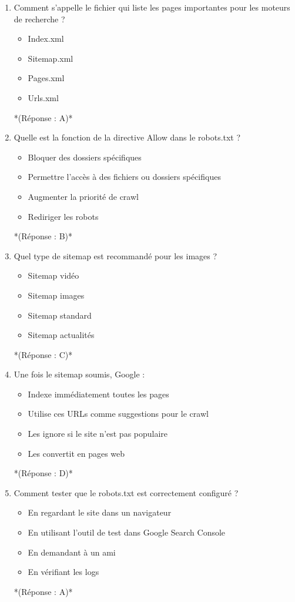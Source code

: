 \documentclass[12pt,a4paper,twoside]{report}
\begin{document}
\begin{enumerate}
\item Comment s'appelle le fichier qui liste les pages importantes pour les moteurs de recherche ?
\begin{itemize}
\item[A)] Index.xml
\item[B)] Sitemap.xml
\item[C)] Pages.xml
\item[D)] Urls.xml
\end{itemize}
*(Réponse : A)*

\item Quelle est la fonction de la directive Allow dans le robots.txt ?
\begin{itemize}
\item[A)] Bloquer des dossiers spécifiques
\item[B)] Permettre l'accès à des fichiers ou dossiers spécifiques
\item[C)] Augmenter la priorité de crawl
\item[D)] Rediriger les robots
\end{itemize}
*(Réponse : B)*

\item Quel type de sitemap est recommandé pour les images ?
\begin{itemize}
\item[A)] Sitemap vidéo
\item[B)] Sitemap images
\item[C)] Sitemap standard
\item[D)] Sitemap actualités
\end{itemize}
*(Réponse : C)*

\item Une fois le sitemap soumis, Google :
\begin{itemize}
\item[A)] Indexe immédiatement toutes les pages
\item[B)] Utilise ces URLs comme suggestions pour le crawl
\item[C)] Les ignore si le site n'est pas populaire
\item[D)] Les convertit en pages web
\end{itemize}
*(Réponse : D)*

\item Comment tester que le robots.txt est correctement configuré ?
\begin{itemize}
\item[A)] En regardant le site dans un navigateur
\item[B)] En utilisant l'outil de test dans Google Search Console
\item[C)] En demandant à un ami
\item[D)] En vérifiant les logs
\end{itemize}
*(Réponse : A)*


\end{enumerate}
\end{document}
